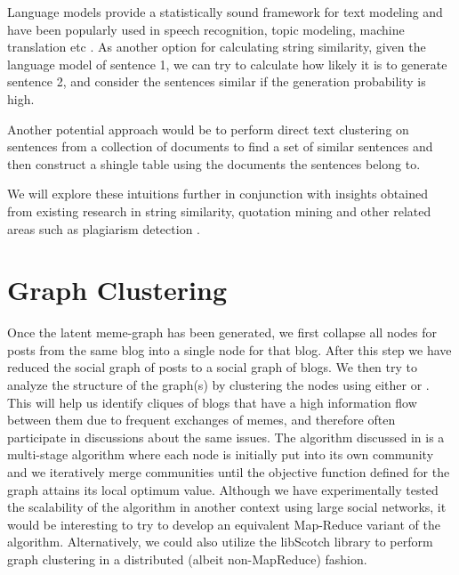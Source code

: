 \documentclass{acm_proc_article-sp}
\begin{document}
Language models provide a statistically sound framework for text modeling and have been popularly used in speech recognition, topic modeling, machine translation etc \cite{ponte1998language}. As another option for calculating string similarity, given the language model of sentence 1, we can try to calculate how likely it is to generate sentence 2, and consider the sentences similar if the generation probability is high.

Another potential approach would be to perform direct text clustering on sentences from a collection of documents to find a set of similar sentences and then construct a shingle table using the documents the sentences belong to.

We will explore these intuitions further in conjunction with insights obtained from existing research in string similarity\cite{achananuparp2008evaluation}, quotation mining and other related areas such as plagiarism detection \cite{kim2009efficient}. 

\section{Graph Clustering}

Once the latent meme-graph has been generated, we first collapse all nodes for posts from the same blog into a single node for that blog. After this step we have reduced the social graph of posts to a social graph of blogs. We then try to analyze the structure of the graph(s) by clustering the nodes using either \cite{blondel2008fast} or \cite{tang2009clustering}. This will help us identify cliques of blogs that have a high information flow between them due to frequent exchanges of memes, and therefore often participate in discussions about the same issues. The algorithm discussed in \cite{blondel2008fast} is a multi-stage algorithm where each node is initially put into its own community and we iteratively merge communities until the objective function defined for the graph attains its local optimum value. Although we have experimentally tested the scalability of the algorithm in another context using large social networks, it would be interesting to try to develop an equivalent Map-Reduce variant of the algorithm. Alternatively, we could also utilize the libScotch library \cite{pellegrini2008scotch} to perform graph clustering in a distributed (albeit non-MapReduce) fashion.
\end{document}
